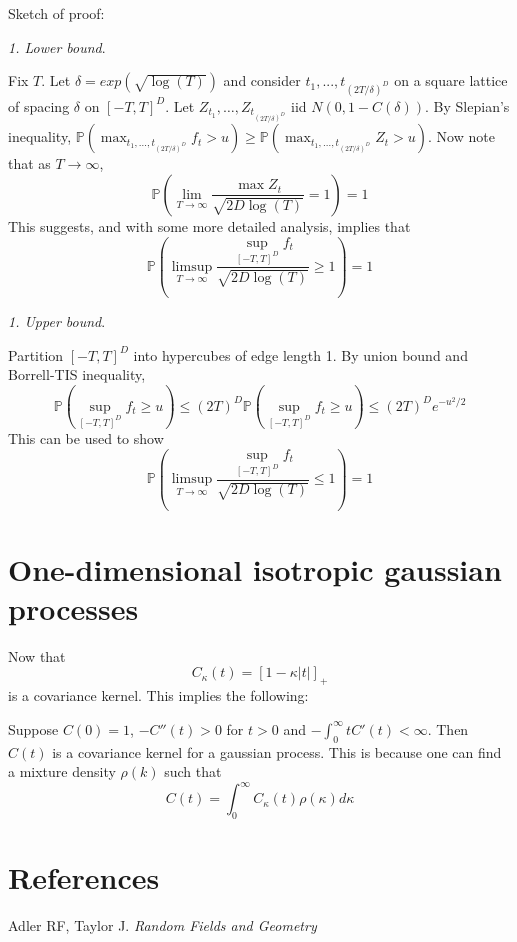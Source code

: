 \documentclass[11pt]{article}
\begin{document}
Sketch of proof:

\emph{1. Lower bound}.

Fix $T$. Let $\delta =exp(\sqrt{\log(T)})$ and consider
$t_1,...,t_{(2T/\delta)^D}$ on a square lattice of spacing $\delta$ on
$[-T,T]^D$.  Let $Z_{t_1},\hdots, Z_{t_{(2T/\delta)^D}}$ iid
$N(0,1-C(\delta))$.  By Slepian's inequality,
$\mathbb{P}(\max_{t_1,\hdots,t_{(2T/\delta)^D}} f_t > u) \geq
\mathbb{P}(\max_{t_1,\hdots,t_{(2T/\delta)^D}} Z_t > u)$.  Now note
that as $T \to \infty$, 
\[
\mathbb{P}\left(\lim_{T \to \infty}\frac{\max
    Z_t}{\sqrt{2D\log(T)}} = 1
\right) = 1
\]
This suggests, and with some more detailed analysis, implies that
\[
\mathbb{P}\left(\limsup_{T \to \infty}\frac{\sup_{[-T,T]^D}
    f_t}{\sqrt{2D\log(T)}} \geq 1
\right) = 1
\]

\emph{1. Upper bound}.

Partition $[-T,T]^D$ into hypercubes of edge length 1.
By union bound and Borrell-TIS inequality,
\[\mathbb{P}(\sup_{[-T,T]^D} f_t \geq u) \leq (2T)^D
\mathbb{P}(\sup_{[-T,T]^D} f_t \geq u) \leq (2T)^D e^{-u^2/2}\]
This can be used to show
\[
\mathbb{P}\left(\limsup_{T \to \infty}\frac{\sup_{[-T,T]^D}
    f_t}{\sqrt{2D\log(T)}} \leq 1
\right) = 1
\]

\section{One-dimensional isotropic gaussian processes}

Now that 
\[
C_\kappa(t) = [1-\kappa|t|]_+
\]
is a covariance kernel. This implies the following:

Suppose $C(0) = 1$, $-C''(t) > 0$ for $t > 0$ and $-\int_0^\infty t
C'(t) <\infty$.
Then $C(t)$ is a covariance kernel for a gaussian process.
This is because one can find a mixture density $\rho(k)$ such that
\[
C(t) = \int_0^\infty C_\kappa(t) \rho(\kappa) d\kappa
\]



\section{References}

Adler RF, Taylor J. \emph{Random Fields and Geometry}
\end{document}
